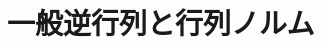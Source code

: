 \documentclass[../../topic_linear-algebra]{subfiles}
\begin{document}
\chapter{一般逆行列と行列ノルム}
\end{document}
